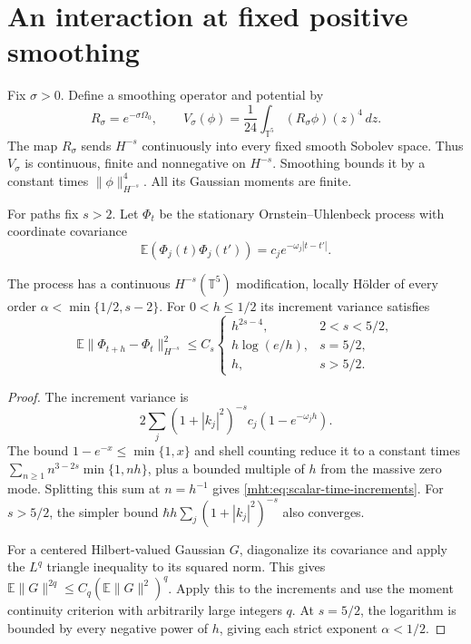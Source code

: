 \section{An interaction at fixed positive smoothing}

Fix $\sigma>0$. Define a smoothing operator and potential by
\begin{equation}\label{mht:eq:scalar-smoothed-potential}
 R_\sigma=e^{-\sigma\Omega_0},\qquad
 V_\sigma(\phi)=\frac1{24}\int_{\mathbb T^5}
                                      (R_\sigma\phi)(z)^4\,dz.
\end{equation}
The map $R_\sigma$ sends $H^{-s}$ continuously into every
fixed smooth Sobolev space. Thus $V_\sigma$ is continuous,
finite and nonnegative on $H^{-s}$. Smoothing bounds it by
a constant times $\|\phi\|_{H^{-s}}^4$.
All its Gaussian moments are finite.

For paths fix $s>2$. Let $\Phi_t$ be the stationary
Ornstein--Uhlenbeck process with coordinate covariance
\[
 \mathbb E(\Phi_j(t)\Phi_j(t'))
                  =c_je^{-\omega_j|t-t'|}.
\]

\begin{proposition}\label{mht:prop:scalar-time-regularity}
The process has a continuous $H^{-s}(\mathbb T^5)$ modification,
locally H\"older of every order $\alpha<\min\{1/2,s-2\}$.
For $0<h\leq1/2$ its increment variance satisfies
\begin{equation}\label{mht:eq:scalar-time-increments}
 \mathbb E\|\Phi_{t+h}-\Phi_t\|_{H^{-s}}^2\leq C_s
 \begin{cases}
 h^{2s-4},&2<s<5/2,\\
 h\log(e/h),&s=5/2,\\
 h,&s>5/2.
 \end{cases}
\end{equation}
\end{proposition}

\begin{proof}
The increment variance is
\[
 2\sum_j(1+|k_j|^2)^{-s}c_j(1-e^{-\omega_jh}).
\]
The bound $1-e^{-x}\leq\min\{1,x\}$ and shell counting reduce it
to a constant times $\sum_{n\geq1}n^{3-2s}\min\{1,nh\}$,
plus a bounded multiple of $h$ from the massive zero mode.
Splitting this sum at $n=h^{-1}$ gives
\eqref{mht:eq:scalar-time-increments}.
For $s>5/2$, the simpler bound
$\hbar h\sum_j(1+|k_j|^2)^{-s}$ also converges.

For a centered Hilbert-valued Gaussian $G$, diagonalize its
covariance and apply the $L^q$ triangle inequality to its squared
norm. This gives
$\mathbb E\|G\|^{2q}\leq C_q(\mathbb E\|G\|^2)^q$.
Apply this to the increments and use the moment continuity
criterion with arbitrarily large integers $q$.
At $s=5/2$, the logarithm is bounded by every negative power
of $h$, giving each strict exponent $\alpha<1/2$.
\end{proof}

